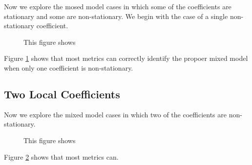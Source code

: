 \documentclass{article}\usepackage[]{graphicx}\usepackage[]{color}
\begin{document}
Now we explore the mosed model cases in which some of the coefficients are stationary and some are non-stationary. We begin with the case of a single non-stationary coefficient. 




\begin{figure}
\caption{This figure shows }
\label{fig:modelIdentificationOneL}
\end{figure}

Figure \ref{fig:modelIdentificationOneL} shows that most metrics can correctly identify the propoer mixed model when only one coefficient is non-stationary.

\subsection{Two Local Coefficients}


Now we explore the mixed model cases in which two of the coefficients are non-stationary. 




\begin{figure}
\caption{This figure shows }
\label{fig:modelIdentificationOneG}
\end{figure}

Figure \ref{fig:modelIdentificationOneG} shows that most metrics can.
\end{document}
